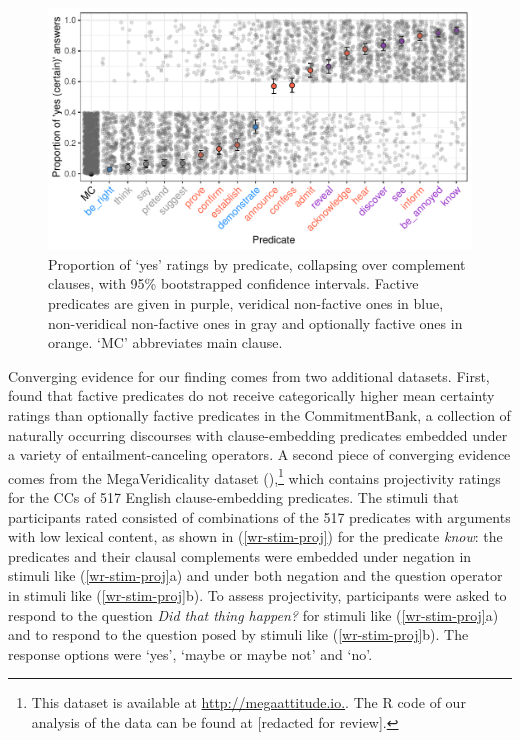 \documentclass[11pt,fleqn]{article}
\newcommand{\6}{\mbox{$[\hspace*{-.6mm}[$}}
\newcommand{\9}{\mbox{$]\hspace*{-.6mm}]$}}
\begin{document}
\begin{figure}[H]

\centering
\includegraphics[width=.7\paperwidth]{../results/8-projectivity-no-fact-binary/graphs/proportion-by-predicate-variability}
\caption{Proportion of `yes' ratings by predicate, collapsing over complement clauses, with 95\% bootstrapped confidence intervals. Factive predicates are given in purple, veridical non-factive ones in blue, non-veridical non-factive ones in gray and optionally factive ones in orange. `MC' abbreviates main clause.}\label{f-projectivity2}

\end{figure}

Converging evidence for our finding comes from two additional datasets. First, \citet*{demarneffe-etal-sub23} found that factive predicates do not receive categorically higher mean certainty ratings than optionally factive predicates in the CommitmentBank, a collection of naturally occurring discourses with clause-embedding predicates embedded under a variety of entailment-canceling operators. A second piece of converging evidence comes from the MegaVeridicality dataset (\citealt{white-rawlins-nels2018,white-etal2018b}),\footnote{This dataset is  available at \url{http://megaattitude.io.}. The R code of our analysis of the data can be found at  [redacted for review].}
which contains projectivity ratings for the CCs of 517 English clause-embedding predicates. The stimuli that participants rated consisted of combinations of the 517 predicates with arguments with low lexical content, as shown in (\ref{wr-stim-proj}) for the predicate {\em know}: the predicates and their clausal complements were embedded under negation in stimuli like (\ref{wr-stim-proj}a) and under both negation and the question operator in stimuli like (\ref{wr-stim-proj}b). To assess projectivity, participants were asked to respond to the question {\em Did that thing happen?} for stimuli like (\ref{wr-stim-proj}a) and to respond to the question posed by stimuli like (\ref{wr-stim-proj}b). The response options were `yes', `maybe or maybe not' and `no'. 
\end{document}
